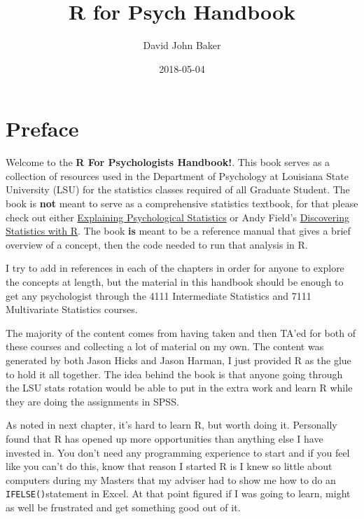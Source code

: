 \documentclass[]{book}
\title{R for Psych Handbook}
\author{David John Baker}
\date{2018-05-04}
\theoremstyle{definition}
\theoremstyle{definition}
\theoremstyle{definition}
\theoremstyle{remark}
\begin{document}
\maketitle

{
\setcounter{tocdepth}{1}
\tableofcontents
}
\chapter{Preface}\label{preface}

Welcome to the \textbf{R For Psychologists Handbook!}. This book serves
as a collection of resources used in the Department of Psychology at
Louisiana State University (LSU) for the statistics classes required of
all Graduate Student. The book is \textbf{not} meant to serve as a
comprehensive statistics textbook, for that please check out either
\href{https://www.wiley.com/en-us/Explaining+Psychological+Statistics\%2C+4th+Edition-p-9781118436608}{Explaining
Psychological Statistics} or Andy Field's
\href{https://us.sagepub.com/en-us/nam/discovering-statistics-using-r/book236067}{Discovering
Statistics with R}. The book \textbf{is} meant to be a reference manual
that gives a brief overview of a concept, then the code needed to run
that analysis in R.

I try to add in references in each of the chapters in order for anyone
to explore the concepts at length, but the material in this handbook
should be enough to get any psychologist through the 4111 Intermediate
Statistics and 7111 Multivariate Statistics courses.

The majority of the content comes from having taken and then TA'ed for
both of these courses and collecting a lot of material on my own. The
content was generated by both Jason Hicks and Jason Harman, I just
provided R as the glue to hold it all together. The idea behind the book
is that anyone going through the LSU stats rotation would be able to put
in the extra work and learn R while they are doing the assignments in
SPSS.

As noted in next chapter, it's hard to learn R, but worth doing it.
Personally found that R has opened up more opportunities than anything
else I have invested in. You don't need any programming experience to
start and if you feel like you can't do this, know that reason I started
R is I knew so little about computers during my Masters that my adviser
had to show me how to do an \texttt{IFELSE()}statement in Excel. At that
point figured if I was going to learn, might as well be frustrated and
get something good out of it.
\end{document}
